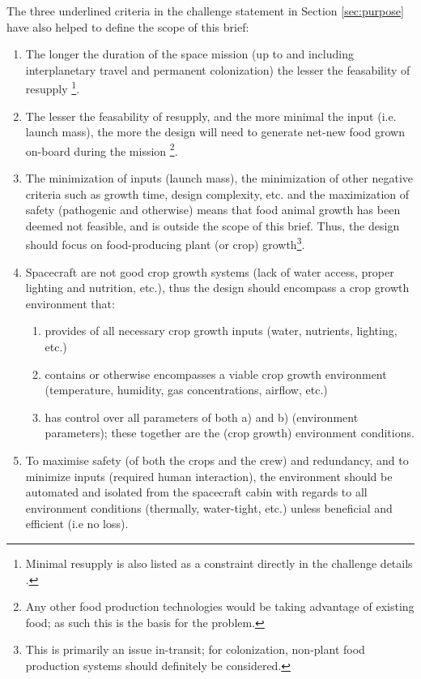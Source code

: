 \documentclass{report}
\begin{document}
The three underlined criteria in the challenge statement in Section \ref{sec:purpose} have also helped to define the 
scope of this brief:

\begin{enumerate}
\item The longer the duration of the space mission (up to and including interplanetary 
    travel and permanent colonization) the lesser the feasability of resupply
    \footnote{Minimal resupply is also listed as a constraint directly in the challenge 
    details \cite{applicantguide}.}.
\item The lesser the feasability of resupply, and the more minimal the input 
    (i.e. launch mass), the more the design will need to generate net-new food 
    grown on-board during the mission \footnote{Any other food production technologies 
    would be taking advantage of existing food; as such this is the basis for the 
    problem.}.
\item The minimization of inputs (launch mass), the minimization of other negative 
    criteria such as growth time, design complexity, etc. and the maximization of 
    safety (pathogenic and otherwise) means that food animal growth has been deemed 
    not feasible, and is outside the scope of this brief. Thus, the design should 
    focus on food-producing plant (or crop) growth\footnote{This is primarily an 
    issue in-transit; for colonization, non-plant food production systems should 
    definitely be considered.}.
\item Spacecraft are not good crop growth systems (lack of water access, proper 
    lighting and nutrition, etc.), thus the design should encompass a crop growth 
    environment that:
    \begin{enumerate}
        \item provides of all necessary crop growth inputs (water, nutrients, lighting, 
        etc.)
        \item contains or otherwise encompasses a viable crop growth environment 
        (temperature, humidity, gas concentrations, airflow, etc.)
        \item has control over all parameters of both a) and b) (environment parameters); 
        these together are the (crop growth) environment conditions.
    \end{enumerate}
\item To maximise safety (of both the crops and the crew) and redundancy, and to minimize 
    inputs (required human interaction), the environment should be automated and isolated 
    from the spacecraft cabin with regards to all environment conditions (thermally, 
    water-tight, etc.) unless beneficial and efficient (i.e no loss).


\end{enumerate}
\end{document}
